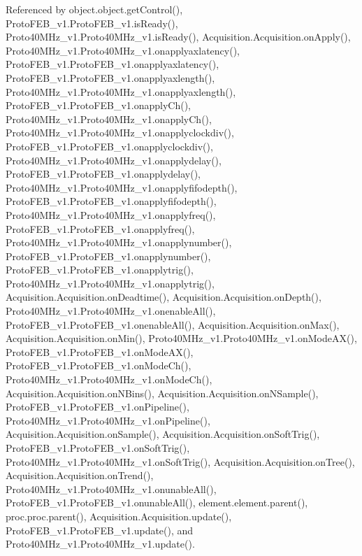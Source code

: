 Referenced by object.\+object.\+get\+Control(), Proto\+F\+E\+B\+\_\+v1.\+Proto\+F\+E\+B\+\_\+v1.\+is\+Ready(), Proto40\+M\+Hz\+\_\+v1.\+Proto40\+M\+Hz\+\_\+v1.\+is\+Ready(), Acquisition.\+Acquisition.\+on\+Apply(), Proto40\+M\+Hz\+\_\+v1.\+Proto40\+M\+Hz\+\_\+v1.\+onapplyaxlatency(), Proto\+F\+E\+B\+\_\+v1.\+Proto\+F\+E\+B\+\_\+v1.\+onapplyaxlatency(), Proto\+F\+E\+B\+\_\+v1.\+Proto\+F\+E\+B\+\_\+v1.\+onapplyaxlength(), Proto40\+M\+Hz\+\_\+v1.\+Proto40\+M\+Hz\+\_\+v1.\+onapplyaxlength(), Proto\+F\+E\+B\+\_\+v1.\+Proto\+F\+E\+B\+\_\+v1.\+onapply\+Ch(), Proto40\+M\+Hz\+\_\+v1.\+Proto40\+M\+Hz\+\_\+v1.\+onapply\+Ch(), Proto40\+M\+Hz\+\_\+v1.\+Proto40\+M\+Hz\+\_\+v1.\+onapplyclockdiv(), Proto\+F\+E\+B\+\_\+v1.\+Proto\+F\+E\+B\+\_\+v1.\+onapplyclockdiv(), Proto40\+M\+Hz\+\_\+v1.\+Proto40\+M\+Hz\+\_\+v1.\+onapplydelay(), Proto\+F\+E\+B\+\_\+v1.\+Proto\+F\+E\+B\+\_\+v1.\+onapplydelay(), Proto40\+M\+Hz\+\_\+v1.\+Proto40\+M\+Hz\+\_\+v1.\+onapplyfifodepth(), Proto\+F\+E\+B\+\_\+v1.\+Proto\+F\+E\+B\+\_\+v1.\+onapplyfifodepth(), Proto40\+M\+Hz\+\_\+v1.\+Proto40\+M\+Hz\+\_\+v1.\+onapplyfreq(), Proto\+F\+E\+B\+\_\+v1.\+Proto\+F\+E\+B\+\_\+v1.\+onapplyfreq(), Proto40\+M\+Hz\+\_\+v1.\+Proto40\+M\+Hz\+\_\+v1.\+onapplynumber(), Proto\+F\+E\+B\+\_\+v1.\+Proto\+F\+E\+B\+\_\+v1.\+onapplynumber(), Proto\+F\+E\+B\+\_\+v1.\+Proto\+F\+E\+B\+\_\+v1.\+onapplytrig(), Proto40\+M\+Hz\+\_\+v1.\+Proto40\+M\+Hz\+\_\+v1.\+onapplytrig(), Acquisition.\+Acquisition.\+on\+Deadtime(), Acquisition.\+Acquisition.\+on\+Depth(), Proto40\+M\+Hz\+\_\+v1.\+Proto40\+M\+Hz\+\_\+v1.\+onenable\+All(), Proto\+F\+E\+B\+\_\+v1.\+Proto\+F\+E\+B\+\_\+v1.\+onenable\+All(), Acquisition.\+Acquisition.\+on\+Max(), Acquisition.\+Acquisition.\+on\+Min(), Proto40\+M\+Hz\+\_\+v1.\+Proto40\+M\+Hz\+\_\+v1.\+on\+Mode\+A\+X(), Proto\+F\+E\+B\+\_\+v1.\+Proto\+F\+E\+B\+\_\+v1.\+on\+Mode\+A\+X(), Proto\+F\+E\+B\+\_\+v1.\+Proto\+F\+E\+B\+\_\+v1.\+on\+Mode\+Ch(), Proto40\+M\+Hz\+\_\+v1.\+Proto40\+M\+Hz\+\_\+v1.\+on\+Mode\+Ch(), Acquisition.\+Acquisition.\+on\+N\+Bins(), Acquisition.\+Acquisition.\+on\+N\+Sample(), Proto\+F\+E\+B\+\_\+v1.\+Proto\+F\+E\+B\+\_\+v1.\+on\+Pipeline(), Proto40\+M\+Hz\+\_\+v1.\+Proto40\+M\+Hz\+\_\+v1.\+on\+Pipeline(), Acquisition.\+Acquisition.\+on\+Sample(), Acquisition.\+Acquisition.\+on\+Soft\+Trig(), Proto\+F\+E\+B\+\_\+v1.\+Proto\+F\+E\+B\+\_\+v1.\+on\+Soft\+Trig(), Proto40\+M\+Hz\+\_\+v1.\+Proto40\+M\+Hz\+\_\+v1.\+on\+Soft\+Trig(), Acquisition.\+Acquisition.\+on\+Tree(), Acquisition.\+Acquisition.\+on\+Trend(), Proto40\+M\+Hz\+\_\+v1.\+Proto40\+M\+Hz\+\_\+v1.\+onunable\+All(), Proto\+F\+E\+B\+\_\+v1.\+Proto\+F\+E\+B\+\_\+v1.\+onunable\+All(), element.\+element.\+parent(), proc.\+proc.\+parent(), Acquisition.\+Acquisition.\+update(), Proto\+F\+E\+B\+\_\+v1.\+Proto\+F\+E\+B\+\_\+v1.\+update(), and Proto40\+M\+Hz\+\_\+v1.\+Proto40\+M\+Hz\+\_\+v1.\+update().


